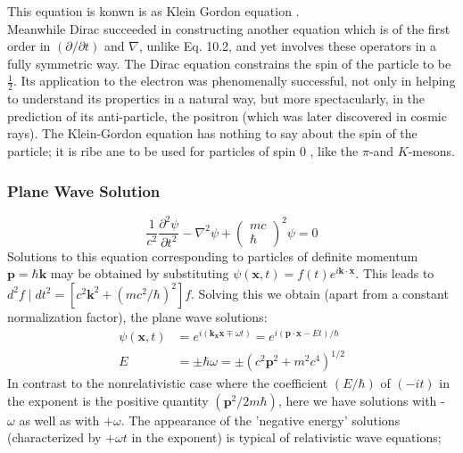 This equation is konwn is as Klein Gordon equation .\\
 Meanwhile Dirac succeeded in constructing another equation which is of the first order in $(\partial / \partial t)$ and $\nabla$, unlike Eq. 10.2, and yet involves these operators in a fully symmetric way. The Dirac equation constrains the spin of the particle to be $\frac{1}{2}$. Its application to the electron was phenomenally successful, not only in helping to understand its propertics in a natural way, but more spectacularly, in the prediction of its anti-particle, the positron (which was later discovered in cosmic rays). The Klein-Gordon equation has nothing to say about the spin of the particle; it is ribe ane to be used for particles of spin 0 , like the $\pi$-and $K$-mesons.\\
 \subsubsection{Plane Wave Solution}
 $$
 \frac{1}{c^{2}} \frac{\partial^{2} \psi}{\partial t^{2}}-\nabla^{2} \psi+\left(\begin{array}{c}
 m c \\
 \hbar
 \end{array}\right)^{2} \psi=0
 $$
 Solutions to this equation corresponding to particles of definite momentum $\mathbf{p}=\hbar \mathbf{k}$ may be obtained by substituting $\psi(\mathbf{x}, t)=f(t) e^{i \mathbf{k} \cdot \mathbf{x}} .$ This leads to $d^{2} f \mid d t^{2}=\left[c^{2} \mathbf{k}^{2}+\left(m c^{2} / \hbar\right)^{2}\right] f$. Solving this we obtain (apart from a constant normalization factor), the plane wave solutions:
 $$
 \begin{aligned}
 \psi(\mathbf{x}, t) &=e^{i\left(\mathbf{k}_{\mathbf{x}} \mathbf{x} \mp \omega t\right)}=e^{i(\mathbf{p} \cdot \mathbf{x}-E t) / \hbar} \\
 E &=\pm \hbar \omega=\pm\left(c^{2} \mathbf{p}^{2}+m^{2} c^{4}\right)^{1 / 2}
 \end{aligned}
 $$
 In contrast to the nonrelativistic case where the coefficient $(E / \hbar)$ of $(-i t)$ in the exponent is the positive quantity $\left(\mathbf{p}^{2} / 2 m \hbar\right)$, here we have solutions with - $\omega$ as well as with $+\omega$. The appearance of the 'negative energy' solutions (characterized by $+\omega t$ in the exponent) is typical of relativistic wave equations;
